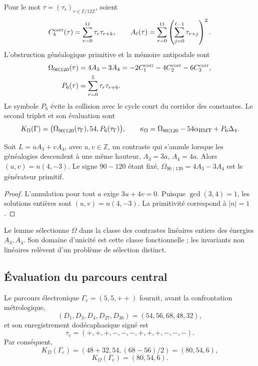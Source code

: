 Pour le mot \(\tau=(\tau_r)_{r\in\mathbb Z/12\mathbb Z}\), soient
\[
 C_k^{\rm corr}(\tau)=\sum_{r=0}^{11}\tau_r\tau_{r+k},
 \qquad
 A_\ell(\tau)=\sum_{r=0}^{11}
 \left(\sum_{j=0}^{\ell-1}\tau_{r+j}\right)^2.
\]
L'obstruction généalogique primitive et la mémoire antipodale sont
\begin{align}
 \Omega_{90\mid120}(\tau)
 &=4A_3-3A_4
 =-2C_1^{\rm corr}-4C_2^{\rm corr}-6C_3^{\rm corr},
 \label{eq:omega-two-way-rev11}\\
 P_6(\tau)&=\sum_{r=0}^{5}\tau_r\tau_{r+6}.
 \label{eq:p6-two-way-rev11}
\end{align}
Le symbole \(P_6\) évite la collision avec le cycle court du corridor des
constantes. Le second triplet et son évaluation sont
\begin{equation}
 K_\Omega(\Gamma)=\bigl(\Omega_{90\mid120}(\tau_\Gamma),54,
 P_6(\tau_\Gamma)\bigr),
 \qquad
 \kappa_\Omega=\Omega_{90\mid120}-54\alpha_{\rm HMT}+P_6\Delta_4.
 \label{eq:kappa-omega-rev11}
\end{equation}

\begin{lemma}
\label{lem:unicidad-omega-rev11}
Soit \(L=uA_3+vA_4\), avec \(u,v\in\mathbb Z\), un contraste qui s'annule
lorsque les généalogies descendent à une même hauteur,
\(A_3=3a\), \(A_4=4a\). Alors
\((u,v)=n(4,-3)\). Le signe \(90-120\) étant fixé,
\(\Omega_{90\mid120}=4A_3-3A_4\) est le générateur primitif.
\end{lemma}

\begin{proof}
L'annulation pour tout \(a\) exige \(3u+4v=0\). Puisque
\(\gcd(3,4)=1\), les solutions entières sont
\((u,v)=n(4,-3)\). La primitivité correspond à \(|n|=1\).
\end{proof}

Le lemme sélectionne \(\Omega\) dans la classe des contrastes linéaires
entiers des énergies \(A_3,A_4\). Son domaine d'unicité est cette classe
fonctionnelle ; les invariants non linéaires relèvent d'un problème de sélection
distinct.

\subsection{Évaluation du parcours central}

Le parcours électronique \(\Gamma_e=(5,5,++)\) fournit, avant la
confrontation métrologique,
\[
 (D_1,D_3,D_4,D_{27},D_{36})=(54,56,68,48,32),
\]
et son enregistrement dodécaphasique signé est
\[
 \tau_e=(+,+,+,-,-,-,+,+,+,-,-,-).
\]
Par conséquent,
\[
 K_D(\Gamma_e)=(48+32,54,(68-56)/2)=(80,54,6),
\]
\[
 K_\Omega(\Gamma_e)=(80,54,6).
\]


